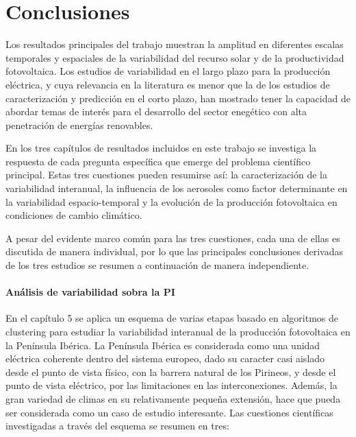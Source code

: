 \chapter*{Conclusiones\label{Conclusiones}}

Los resultados principales del trabajo muestran la amplitud en diferentes escalas temporales y espaciales de la variabilidad del recurso solar y de la productividad fotovoltaica. Los estudios de variabilidad en el largo plazo para la producción eléctrica, y cuya relevancia en la literatura es menor que la de los estudios de caracterización y predicción en el corto plazo, han mostrado tener la capacidad de abordar temas de interés para el desarrollo del sector enegético con alta penetración de energías renovables.

En los tres capítulos de resultados incluidos en este trabajo se investiga la respuesta de cada pregunta específica que emerge del problema científico principal. Estas tres cuestiones pueden resumirse así: la caracterización de la variabilidad interanual, la influencia de los aerosoles como factor determinante en la variabilidad espacio-temporal y la evolución de la producción fotovoltaica en condiciones de cambio climático. 

A pesar del evidente marco común para las tres cuestiones, cada una de ellas es discutida de manera individual, por lo que las principales conclusiones derivadas de los tres estudios se resumen a continuación de manera independiente.

\subsubsection{Análisis de variabilidad sobra la PI}

En el capítulo 5 se aplica un esquema de varias etapas basado en algoritmos de clustering para estudiar la variabilidad interanual de la producción fotovoltaica en la Península Ibérica. La Península Ibérica es considerada como una unidad eléctrica coherente dentro del sistema europeo, dado su caracter casi aislado desde el punto de vista físico, con la barrera natural de los Pirineos, y desde el punto de vista eléctrico, por las limitaciones en las interconexiones. Además, la gran variedad de climas en su relativamente pequeña extensión, hace que pueda ser considerada como un caso de estudio interesante. Las cuestiones científicas investigadas a través del esquema se resumen en tres:   

